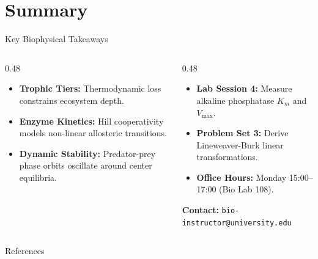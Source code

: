 \documentclass[aspectratio=169, 9pt]{beamer}
\begin{document}
\section{Summary}
\begin{frame}{Key Biophysical Takeaways}
    \begin{columns}[t]
        \begin{column}{0.48\textwidth}
            \par\vspace{0.3em}
            \begin{itemize}\setlength{\itemsep}{2.5pt}
                \item \textbf{Trophic Tiers:} Thermodynamic loss constrains ecosystem depth.
                \item \textbf{Enzyme Kinetics:} Hill cooperativity models non-linear allosteric transitions.
                \item \textbf{Dynamic Stability:} Predator-prey phase orbits oscillate around center equilibria.
            \end{itemize}
        \end{column}
        \begin{column}{0.48\textwidth}
            \par\vspace{0.3em}
            \begin{itemize}\setlength{\itemsep}{2.5pt}
                \item \textbf{Lab Session 4:} Measure alkaline phosphatase $K_m$ and $V_{\max}$.
                \item \textbf{Problem Set 3:} Derive Lineweaver-Burk linear transformations.
                \item \textbf{Office Hours:} Monday 15:00--17:00 (Bio Lab 108).
            \end{itemize}
            \vspace{0.3em}
            \begin{takeaway}
                \textbf{Contact:} \texttt{bio-instructor@university.edu}
            \end{takeaway}
        \end{column}
    \end{columns}
\end{frame}

\begin{frame}[allowframebreaks]{References}
    \printbibliography
\end{frame}
\end{document}
